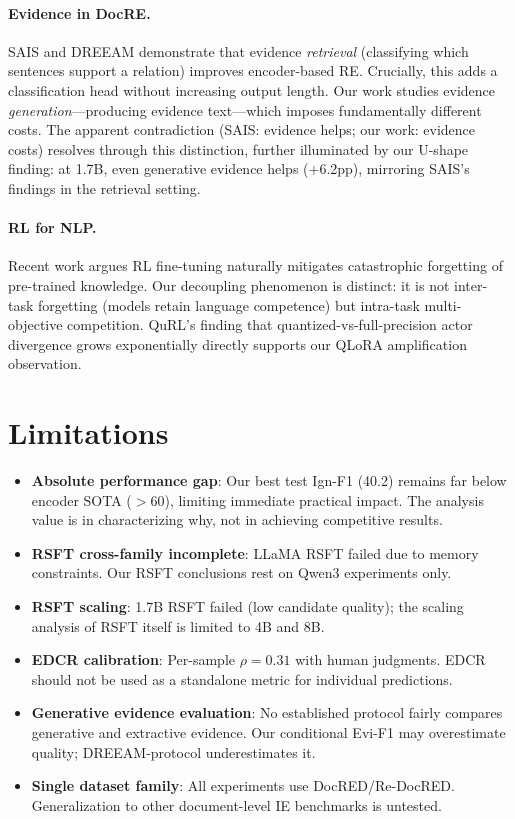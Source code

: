 \documentclass[11pt]{article}
\begin{document}
\paragraph{Evidence in DocRE.} SAIS and DREEAM demonstrate that evidence \textit{retrieval} (classifying which sentences support a relation) improves encoder-based RE. Crucially, this adds a classification head without increasing output length. Our work studies evidence \textit{generation}---producing evidence text---which imposes fundamentally different costs. The apparent contradiction (SAIS: evidence helps; our work: evidence costs) resolves through this distinction, further illuminated by our U-shape finding: at 1.7B, even generative evidence helps (+6.2pp), mirroring SAIS's findings in the retrieval setting.

\paragraph{RL for NLP.} Recent work argues RL fine-tuning naturally mitigates catastrophic forgetting of pre-trained knowledge. Our decoupling phenomenon is distinct: it is not inter-task forgetting (models retain language competence) but intra-task multi-objective competition. QuRL's finding that quantized-vs-full-precision actor divergence grows exponentially directly supports our QLoRA amplification observation.

\section{Limitations}

\begin{itemize}
\item \textbf{Absolute performance gap}: Our best test Ign-F1 (40.2) remains far below encoder SOTA ($>$60), limiting immediate practical impact. The analysis value is in characterizing why, not in achieving competitive results.
\item \textbf{RSFT cross-family incomplete}: LLaMA RSFT failed due to memory constraints. Our RSFT conclusions rest on Qwen3 experiments only.
\item \textbf{RSFT scaling}: 1.7B RSFT failed (low candidate quality); the scaling analysis of RSFT itself is limited to 4B and 8B.
\item \textbf{EDCR calibration}: Per-sample $\rho=0.31$ with human judgments. EDCR should not be used as a standalone metric for individual predictions.
\item \textbf{Generative evidence evaluation}: No established protocol fairly compares generative and extractive evidence. Our conditional Evi-F1 may overestimate quality; DREEAM-protocol underestimates it.
\item \textbf{Single dataset family}: All experiments use DocRED/Re-DocRED. Generalization to other document-level IE benchmarks is untested.
\end{itemize}
\end{document}
